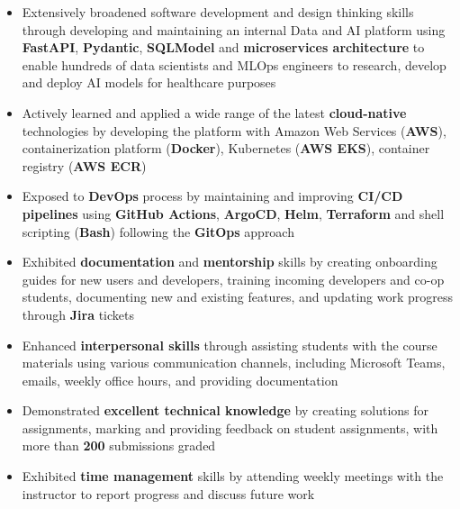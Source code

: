 \documentclass[12pt,letterpaper,sans]{moderncv}        %
\begin{document}
\vspace{1.0em}

\newpage

\begin{itemize}
  \item Extensively broadened software development and design thinking skills through developing and maintaining an internal Data and AI platform using \textbf{FastAPI}, \textbf{Pydantic}, \textbf{SQLModel} and \textbf{microservices architecture} to enable hundreds of data scientists and MLOps engineers to research, develop and deploy AI models for healthcare purposes
  \item Actively learned and applied a wide range of the latest \textbf{cloud-native} technologies by developing the platform with Amazon Web Services (\textbf{AWS}), containerization platform (\textbf{Docker}), Kubernetes (\textbf{AWS EKS}), container registry (\textbf{AWS ECR})
  \item Exposed to \textbf{DevOps} process by maintaining and improving \textbf{CI/CD pipelines} using \textbf{GitHub Actions}, \textbf{ArgoCD}, \textbf{Helm}, \textbf{Terraform} and shell scripting (\textbf{Bash}) following the \textbf{GitOps} approach
  \item Exhibited \textbf{documentation} and \textbf{mentorship} skills by creating onboarding guides for new users and developers, training incoming developers and co-op students, documenting new and existing features, and updating work progress through \textbf{Jira} tickets
\end{itemize}

\vspace{1.0em}

\begin{itemize}
  \item Enhanced \textbf{interpersonal skills} through assisting students with the course materials using various communication channels, including Microsoft Teams, emails, weekly office hours, and providing documentation
  \item Demonstrated \textbf{excellent technical knowledge} by creating solutions for assignments, marking and providing feedback on student assignments, with more than \textbf{200} submissions graded
  \item Exhibited \textbf{time management} skills by attending weekly meetings with the instructor to report progress and discuss future work
\end{itemize}
\end{document}
